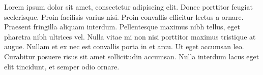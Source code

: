 Lorem ipsum dolor sit amet, 
consectetur adipiscing elit. 
Donec porttitor feugiat scelerisque. 
Proin facilisis varius nisi. 
Proin convallis efficitur lectus a ornare. 
Praesent fringilla aliquam interdum. 
Pellentesque maximus nibh tellus, eget pharetra nibh ultrices vel. 
Nulla vitae mi non nisi porttitor maximus tristique at augue. 
Nullam et ex nec est convallis porta in et arcu. 
Ut eget accumsan leo. 
Curabitur posuere risus sit amet sollicitudin accumsan. 
Nulla interdum lacus eget elit tincidunt, et semper odio ornare.